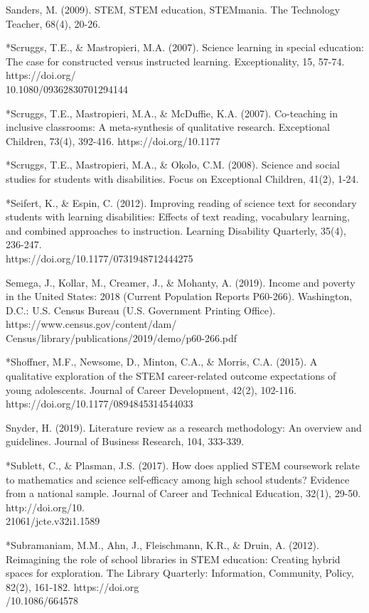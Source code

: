 \documentclass[11pt]{sig-alternate}
\begin{document}
\begin{large}
Sanders, M. (2009). STEM, STEM education, STEMmania. The Technology Teacher, 68(4),
20-26. 

*Scruggs, T.E., \& Mastropieri, M.A. (2007). Science learning in special education: The case for 
constructed versus instructed learning. Exceptionality, 15, 57-74. https://doi.org/\\10.1080/09362830701294144

*Scruggs, T.E., Mastropieri, M.A., \& McDuffie, K.A. (2007). Co-teaching in inclusive classrooms: A meta-synthesis of qualitative research. Exceptional Children, 73(4), 
392-416. https://doi.org/10.1177%

*Scruggs, T.E., Mastropieri, M.A., \& Okolo, C.M. (2008). Science and social studies for 
students with disabilities. Focus on Exceptional Children, 41(2), 1-24.

*Seifert, K., \& Espin, C. (2012). Improving reading of science text for secondary students with learning disabilities: Effects of text reading, vocabulary learning, and combined approaches to instruction. Learning Disability Quarterly, 35(4), 236-247. \\
https://doi.org/10.1177/0731948712444275 

Semega, J., Kollar, M., Creamer, J., \& Mohanty, A. (2019). Income and poverty in the United 
States: 2018 (Current Population Reports P60-266). Washington, D.C.: U.S. Census Bureau (U.S. Government Printing Office). https://www.census.gov/content/dam/ \\Census/library/publications/2019/demo/p60-266.pdf

*Shoffner, M.F., Newsome, D., Minton, C.A., \& Morris, C.A. (2015). A qualitative exploration of the STEM career-related outcome expectations of young adolescents. Journal of Career Development, 42(2), 102-116. https://doi.org/10.1177/0894845314544033

Snyder, H. (2019). Literature review as a research methodology: An overview and guidelines. Journal of Business Research, 104, 333-339.

*Sublett, C., \& Plasman, J.S. (2017). How does applied STEM coursework relate to mathematics  and science self-efficacy among high school students? Evidence from a national sample. Journal of Career and Technical Education, 32(1), 29-50. 
	http://doi.org/10.\\21061/jcte.v32i1.1589

*Subramaniam, M.M., Ahn, J., Fleischmann, K.R., \& Druin, A. (2012). Reimagining the role of school libraries in STEM education: Creating hybrid spaces for exploration. The Library Quarterly: Information, Community, Policy, 82(2), 161-182.
	https://doi.org\\/10.1086/664578


\end{large}
\end{document}
